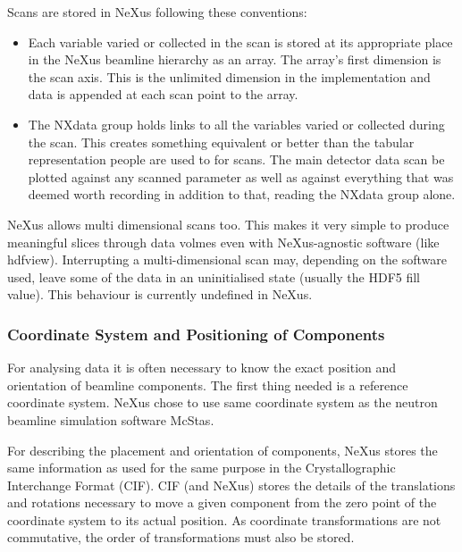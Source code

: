 \documentclass[%
 aip,
rsi,
 amsmath,amssymb,
 reprint,%
]{revtex4-1}
\begin{document}
Scans are stored in NeXus following these conventions: 
\begin{itemize}
\item Each variable varied or collected in the scan is stored at its appropriate place in the NeXus beamline 
 hierarchy as an array. The array's first dimension is the scan axis. This is the unlimited dimension in 
 the implementation and data is appended at each scan point to the array. 
\item The NXdata group holds links to all the variables varied or collected during the scan. 
 This creates something equivalent or better than the tabular representation people are used to for scans. 
 The main detector data scan be plotted against any scanned parameter as well as against everything that was 
 deemed worth recording in addition to that, reading the NXdata group alone. 
\end{itemize}

NeXus allows multi dimensional scans too. This makes it very simple to produce meaningful slices through data 
volmes even with NeXus-agnostic software (like hdfview). Interrupting a multi-dimensional scan may, depending 
on the software used, leave some of the data in an uninitialised state (usually the HDF5 fill value). 
This behaviour is currently undefined in NeXus.

\subsubsection{Coordinate System and Positioning of Components}

For analysing data it is often necessary to know the exact position and orientation of beamline components. 
The first thing needed is a reference coordinate system. NeXus chose to use same coordinate system as the 
neutron beamline simulation software McStas\cite{mcstas}. 

For describing the placement and orientation of components, NeXus stores the same information as used for the 
same purpose in the Crystallographic Interchange Format (CIF)\cite{ITCVG}. CIF (and NeXus) stores the details 
of the translations and rotations necessary to move a given component from the zero point of the coordinate 
system to its actual position. As coordinate transformations are not commutative, the order of transformations 
must also be stored.
\end{document}
